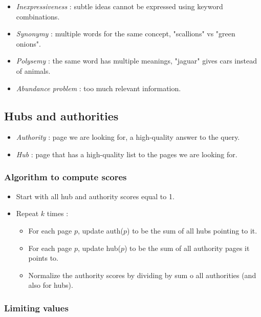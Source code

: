 \begin{itemize}
\item \textit{Inexpressiveness} : subtle ideas cannot be expressed using keyword combinations.
\item \textit{Synonymy} : multiple words for the same concept, "scallions" vs "green onions".
\item \textit{Polysemy} : the same word has multiple meanings, "jaguar" gives cars instead of animals.
\item \textit{Abundance problem} : too much relevant information.
\end{itemize}

\subsection{Hubs and authorities}

\begin{itemize}
\item \textit{Authority} : page we are looking for, a high-quality answer to the query.
\item \textit{Hub} : page that has a high-quality list to the pages we are looking for.
\end{itemize}

\subsubsection{Algorithm to compute scores}

\begin{itemize}
\item Start with all hub and authority scores equal to 1.
\item Repeat $k$ times :
	\begin{itemize}
	\item For each page $p$, update auth($p$) to be the sum of all hubs pointing to it.
	\item For each page $p$, update hub($p$) to be the sum of all authority pages it points to.
	\item Normalize the authority scores by dividing by sum o all authorities (and also for hubs).
	\end{itemize}
\end{itemize}

\subsubsection{Limiting values}

